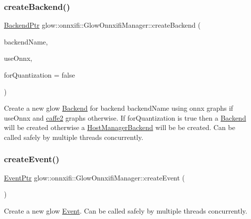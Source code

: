 \subsubsection{\texorpdfstring{create\+Backend()}{createBackend()}}
{\footnotesize\ttfamily \hyperlink{classglow_1_1onnxifi_1_1_backend}{Backend\+Ptr} glow\+::onnxifi\+::\+Glow\+Onnxifi\+Manager\+::create\+Backend (\begin{DoxyParamCaption}\item[{llvm\+::\+String\+Ref}]{backend\+Name,  }\item[{bool}]{use\+Onnx,  }\item[{bool}]{for\+Quantization = {\ttfamily false} }\end{DoxyParamCaption})}

Create a new glow \hyperlink{classglow_1_1onnxifi_1_1_backend}{Backend} for backend {\ttfamily backend\+Name} using onnx graphs if {\ttfamily use\+Onnx} and \hyperlink{namespacecaffe2}{caffe2} graphs otherwise. If {\ttfamily for\+Quantization} is true then a \hyperlink{classglow_1_1onnxifi_1_1_backend}{Backend} will be created otherwise a \hyperlink{classglow_1_1onnxifi_1_1_host_manager_backend}{Host\+Manager\+Backend} will be be created. Can be called safely by multiple threads concurrently. \mbox{\label{classglow_1_1onnxifi_1_1_glow_onnxifi_manager_aa4e8c1c658fe5053daea441809b91d14}} 
\subsubsection{\texorpdfstring{create\+Event()}{createEvent()}}
{\footnotesize\ttfamily \hyperlink{classglow_1_1onnxifi_1_1_event}{Event\+Ptr} glow\+::onnxifi\+::\+Glow\+Onnxifi\+Manager\+::create\+Event (\begin{DoxyParamCaption}{ }\end{DoxyParamCaption})}

Create a new glow \hyperlink{classglow_1_1onnxifi_1_1_event}{Event}. Can be called safely by multiple threads concurrently. \mbox{\label{classglow_1_1onnxifi_1_1_glow_onnxifi_manager_ada8d8295e1d7471244a16e72f0aba40d}} 
